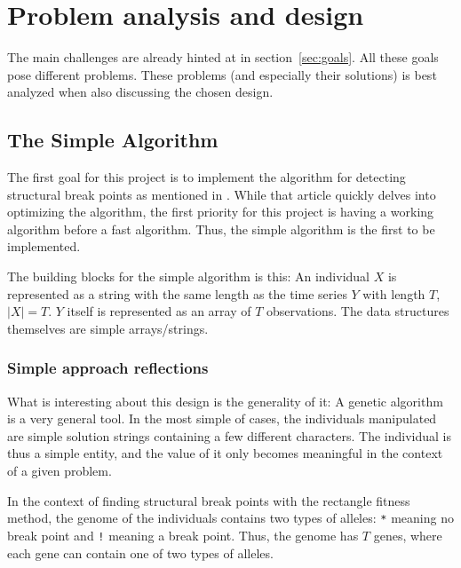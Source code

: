 
\clearpage
\section{Problem analysis and design} \label{sec:analysis-design} 

The main challenges are already hinted at in section~\ref{sec:goals}. All these
goals pose different problems. These problems (and especially their solutions)
is best analyzed when also discussing the chosen design.


\subsection{The Simple Algorithm} \label{sec:simple-algorithm} 

The first goal for this project is to implement the algorithm for detecting
structural break points as mentioned in \cite{doerr2017a}. While that article
quickly delves into optimizing the algorithm, the first priority for this
project is having a working algorithm before a fast algorithm. Thus, the simple
algorithm is the first to be implemented. 

The building blocks for the simple algorithm is this: An individual $X$
is represented as a string with the same length as the time series $Y$ with
length $T$, $|X| = T$. $Y$ itself is represented as an array of $T$
observations. The data structures themselves are simple arrays/strings. 

\subsubsection{Simple approach reflections} \label{sec:simple-approach-refl}

What is interesting about this design is the generality of it: A
genetic algorithm is a very general tool. In the most simple of cases, the
individuals manipulated are simple solution strings containing a few different 
characters. The individual is thus a simple entity, and the value
of it only becomes meaningful in the context of a given problem.

In the context of finding structural break points with the rectangle fitness
method, the genome of the individuals contains two types of alleles: \texttt{*}
meaning no break point and \texttt{!} meaning a break point. Thus, the genome
has $T$ genes, where each gene can contain one of two types of alleles. 


